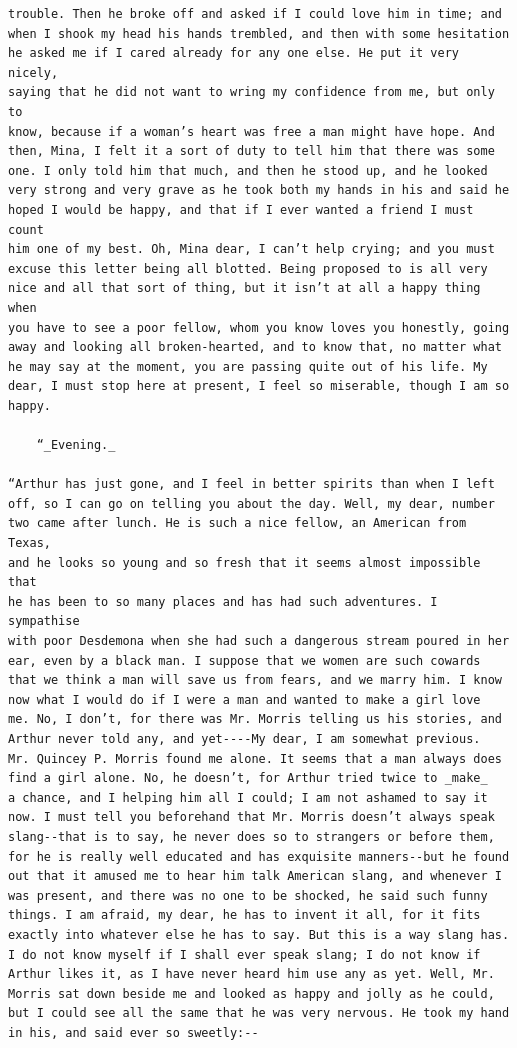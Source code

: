 \documentclass{article}
\begin{document}
\begin{verbatim}
trouble. Then he broke off and asked if I could love him in time; and
when I shook my head his hands trembled, and then with some hesitation
he asked me if I cared already for any one else. He put it very nicely,
saying that he did not want to wring my confidence from me, but only to
know, because if a woman’s heart was free a man might have hope. And
then, Mina, I felt it a sort of duty to tell him that there was some
one. I only told him that much, and then he stood up, and he looked
very strong and very grave as he took both my hands in his and said he
hoped I would be happy, and that if I ever wanted a friend I must count
him one of my best. Oh, Mina dear, I can’t help crying; and you must
excuse this letter being all blotted. Being proposed to is all very
nice and all that sort of thing, but it isn’t at all a happy thing when
you have to see a poor fellow, whom you know loves you honestly, going
away and looking all broken-hearted, and to know that, no matter what
he may say at the moment, you are passing quite out of his life. My
dear, I must stop here at present, I feel so miserable, though I am so
happy.

    “_Evening._

“Arthur has just gone, and I feel in better spirits than when I left
off, so I can go on telling you about the day. Well, my dear, number
two came after lunch. He is such a nice fellow, an American from Texas,
and he looks so young and so fresh that it seems almost impossible that
he has been to so many places and has had such adventures. I sympathise
with poor Desdemona when she had such a dangerous stream poured in her
ear, even by a black man. I suppose that we women are such cowards
that we think a man will save us from fears, and we marry him. I know
now what I would do if I were a man and wanted to make a girl love
me. No, I don’t, for there was Mr. Morris telling us his stories, and
Arthur never told any, and yet----My dear, I am somewhat previous.
Mr. Quincey P. Morris found me alone. It seems that a man always does
find a girl alone. No, he doesn’t, for Arthur tried twice to _make_
a chance, and I helping him all I could; I am not ashamed to say it
now. I must tell you beforehand that Mr. Morris doesn’t always speak
slang--that is to say, he never does so to strangers or before them,
for he is really well educated and has exquisite manners--but he found
out that it amused me to hear him talk American slang, and whenever I
was present, and there was no one to be shocked, he said such funny
things. I am afraid, my dear, he has to invent it all, for it fits
exactly into whatever else he has to say. But this is a way slang has.
I do not know myself if I shall ever speak slang; I do not know if
Arthur likes it, as I have never heard him use any as yet. Well, Mr.
Morris sat down beside me and looked as happy and jolly as he could,
but I could see all the same that he was very nervous. He took my hand
in his, and said ever so sweetly:--


\end{verbatim}
\end{document}
